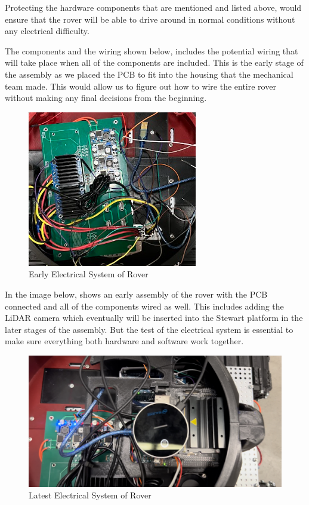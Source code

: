 \documentclass[a4paper, 10pt]{article}
\begin{document}
Protecting the hardware components that are mentioned and listed above, would ensure that the rover will be able to drive around in normal conditions without any electrical difficulty. 

The components and the wiring shown below, includes the potential wiring that will take place when all of the components are included. This is the early stage of the assembly as we placed the PCB to fit into the housing that the mechanical team made. This would allow us to figure out how to wire the entire rover without making any final decisions from the beginning.
 
 		\begin{figure} [h]
			\centering
			\includegraphics[scale=0.15]{Rover PCB (Wired)}
			\caption{Early Electrical System of Rover}
		\end{figure}

In the image below, shows an early assembly of the rover with the PCB connected and all of the components wired as well. This includes adding the LiDAR camera which eventually will be inserted into the Stewart platform in the later stages of the assembly. But the test of the electrical system is essential to make sure everything both hardware and software work together.

\begin{figure} [h]
			\centering
			\includegraphics[scale=0.15]{Rover PCB (Assembled)}
			\caption{Latest Electrical System of Rover}
		\end{figure}
		
\end{document}
